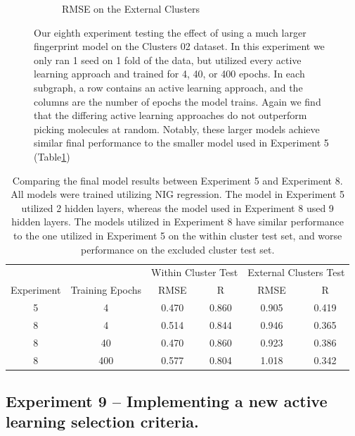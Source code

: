 \documentclass[journal=jmcmar,manuscript=article]{achemso}
\begin{document}
\begin{figure}[tbph]
\begin{subfigure}[b]{0.48\textwidth}
        \caption{RMSE on the External Clusters}
    \end{subfigure}
    \caption{Our eighth experiment testing the effect of using a much larger fingerprint model on the Clusters 02 dataset. In this experiment we only ran 1 seed on 1 fold of the data, but utilized every active learning approach and trained for 4, 40, or 400 epochs. In each subgraph, a row contains an active learning approach, and the columns are the number of epochs the model trains. Again we find that the differing active learning approaches do not outperform picking molecules at random. Notably, these larger models achieve similar final performance to the smaller model used in Experiment 5 (Table\ref{tab:NIGcompare})}
    \label{fig:bigmodel}
\end{figure}

\begin{table}[]
    \centering
    \begin{tabular}{c|c|c|c|c|c}
    \hline
        &  & \multicolumn{2}{c|}{Within Cluster Test} & \multicolumn{2}{c}{External Clusters Test} \\
        Experiment & Training Epochs & RMSE & R & RMSE & R \\
    \hline
        5 & 4 & 0.470 & 0.860 & 0.905 & 0.419 \\
        8 & 4 & 0.514 & 0.844 & 0.946 & 0.365 \\
        8 & 40 & 0.470 & 0.860 & 0.923 & 0.386 \\
        8 & 400 & 0.577 & 0.804 & 1.018 & 0.342 \\
    \hline
    \end{tabular}
    \caption{Comparing the final model results between Experiment 5 and Experiment 8. All models were trained utilizing NIG regression. The model in Experiment 5 utilized 2 hidden layers, whereas the model used in Experiment 8 used 9 hidden layers. The models utilized in Experiment 8 have similar performance to the one utilized in Experiment 5 on the within cluster test set, and worse performance on the excluded cluster test set.}
    \label{tab:NIGcompare}
\end{table}

\subsection{Experiment 9 -- Implementing a new active learning selection criteria.}
\end{document}
